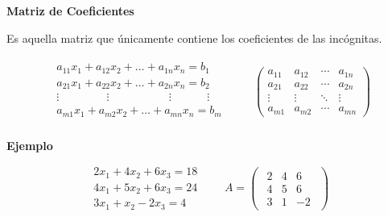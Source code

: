 \documentclass{article}
\begin{document}
\begin{large}
    \textbf{Matriz de Coeficientes}
\end{large}

Es aquella matriz que únicamente contiene los coeficientes de las incógnitas.

\begin{equation*}
    \begin{matrix}
        \begin{aligned}
            a_{11}x_1 + a_{12}x_2 + \dots + a_{1n}x_n = b_1\\
            a_{21}x_1 + a_{22}x_2 + \dots + a_{2n}x_n = b_2\\
            \vdots \phantom{aaaaaaaa} \vdots \phantom{aaaaaaaaaa} \vdots \phantom{aaaaaa} \vdots\\
            a_{m1}x_1 + a_{m2}x_2 + \dots + a_{mn}x_n = b_m\\
        \end{aligned}
    \end{matrix}
    \quad \quad \begin{pmatrix}
            a_{11} & a_{12} & \dotsb & a_{1n}\\
            a_{21} & a_{22} & \dotsb & a_{2n}\\
            \vdots & \vdots & \ddots & \vdots\\
            a_{m1} & a_{m2} & \dotsb & a_{mn}
    \end{pmatrix} 
\end{equation*}

\begin{large}
    \textbf{Ejemplo}
\end{large}

\begin{equation*}
    \begin{aligned}
            2x_1 + 4x_2 + 6x_3 =18\\
            4x_1 + 5x_2 + 6x_3 =24\\
            3x_1 + x_2  - 2x_3 =4            
    \end{aligned}
    \quad \quad A = \begin{pmatrix}
        \begin{array}{rrr}
            2 & 4 & 6 \\
            4 & 5 & 6 \\
            3 & 1 & -2         
        \end{array}    
    \end{pmatrix}
\end{equation*}
\end{document}

